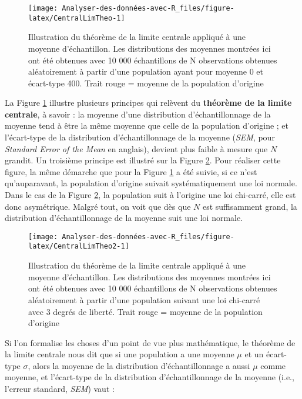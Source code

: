 \documentclass[
  french,
]{book}
\begin{document}
\begin{figure}

{\centering \texttt{[image: Analyser-des-données-avec-R\_files/figure-latex/CentralLimTheo-1]} 

}

\caption{Illustration du théorème de la limite centrale appliqué à une moyenne d'échantillon. Les distributions des moyennes montrées ici ont été obtenues avec 10 000 échantillons de N observations obtenues aléatoirement à partir d'une population ayant pour moyenne 0 et écart-type 400. Trait rouge = moyenne de la population d'origine}\label{fig:CentralLimTheo}
\end{figure}

La Figure \ref{fig:CentralLimTheo} illustre plusieurs principes qui relèvent du \textbf{théorème de la limite centrale}, à savoir : la moyenne d'une distribution d'échantillonnage de la moyenne tend à être la même moyenne que celle de la population d'origine ; et l'écart-type de la distribution d'échantillonnage de la moyenne (\emph{SEM}, pour \emph{Standard Error of the Mean} en anglais), devient plus faible à mesure que \(N\) grandit. Un troisième principe est illustré sur la Figure \ref{fig:CentralLimTheo2}. Pour réaliser cette figure, la même démarche que pour la Figure \ref{fig:CentralLimTheo} a été suivie, si ce n'est qu'auparavant, la population d'origine suivait systématiquement une loi normale. Dans le cas de la Figure \ref{fig:CentralLimTheo2}, la population suit à l'origine une loi chi-carré, elle est donc asymétrique. Malgré tout, on voit que dès que \(N\) est suffisamment grand, la distribution d'échantillonnage de la moyenne suit une loi normale.

\begin{figure}

{\centering \texttt{[image: Analyser-des-données-avec-R\_files/figure-latex/CentralLimTheo2-1]} 

}

\caption{Illustration du théorème de la limite centrale appliqué à une moyenne d'échantillon. Les distributions des moyennes montrées ici ont été obtenues avec 10 000 échantillons de N observations obtenues aléatoirement à partir d'une population suivant une loi chi-carré avec 3 degrés de liberté. Trait rouge = moyenne de la population d'origine}\label{fig:CentralLimTheo2}
\end{figure}

Si l'on formalise les choses d'un point de vue plus mathématique, le théorème de la limite centrale nous dit que si une population a une moyenne \(\mu\) et un écart-type \(\sigma\), alors la moyenne de la distribution d'échantillonnage a aussi \(\mu\) comme moyenne, et l'écart-type de la distribution d'échantillonnage de la moyenne (i.e., l'erreur standard, \emph{SEM}) vaut :
\end{document}
